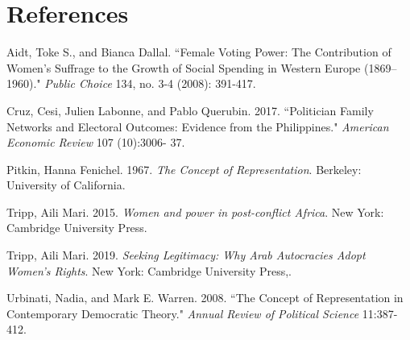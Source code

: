 \documentclass[12pt]{article}
\begin{document}
\pagebreak

\section*{References}

Aidt, Toke S., and Bianca Dallal. ``Female Voting Power: The Contribution of Women’s Suffrage to the Growth of Social Spending in Western Europe (1869–1960)." \textit{Public Choice} 134, no. 3-4 (2008): 391-417.

Cruz, Cesi, Julien Labonne, and Pablo Querubin. 2017. ``Politician Family Networks and Electoral Outcomes: Evidence from the Philippines." \textit{American Economic Review} 107 (10):3006- 37.

Pitkin, Hanna Fenichel. 1967. \textit{The Concept of Representation}. Berkeley: University of California. 

Tripp, Aili Mari. 2015. \textit{Women and power in post-conflict Africa}. New York: Cambridge University Press.

Tripp, Aili Mari. 2019. \textit{Seeking Legitimacy: Why Arab Autocracies Adopt Women's Rights}. New York: Cambridge University Press,.

Urbinati, Nadia, and Mark E. Warren. 2008. ``The Concept of Representation in Contemporary Democratic Theory." \textit{Annual Review of Political Science} 11:387-412.
\end{document}
